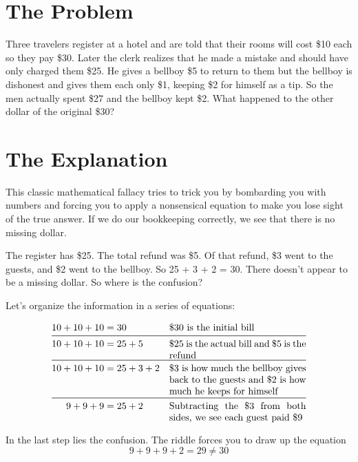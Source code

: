 

\section*{The Problem}
Three travelers register at a hotel and are told that their rooms will cost \$10 each so they pay \$30. Later the clerk realizes that he made a mistake and should have only charged them \$25. He gives a bellboy \$5 to return to them but the bellboy is dishonest and gives them each only \$1, keeping \$2 for himself as a tip. So the men actually spent \$27 and the bellboy kept \$2. What happened to the other dollar of the original \$30?

\section*{The Explanation}
This classic mathematical fallacy tries to trick you by bombarding you with numbers and forcing you to apply a nonsensical equation to make you lose sight of the true answer. If we do our bookkeeping correctly, we see that there is no missing dollar. 

The register has \$25. The total refund was \$5. Of that refund, \$3 went to the guests, and \$2 went to the bellboy. So 25 + 3 + 2 = 30. There doesn’t appear to be a missing dollar. So where is the confusion?

Let’s organize the information in a series of equations:

\vspace{-5mm}

\begin{align*}
    10 + 10 + 10 &= 30 && \text{\$30 is the initial bill} \\
    \midrule
    10 + 10 + 10 &= 25 + 5 && \parbox[t]{5cm}{
          \$25 is the actual bill and \$5 is the refund} \\
    \midrule
    10 + 10 + 10 &= 25 + 3 + 2 && \parbox[t]{5cm}{
          \$3 is how much the bellboy gives back to the guests and \$2 is how much he keeps for himself} \\
    \midrule
    9 + 9 + 9 &= 25 + 2 && \parbox[t]{5cm}{
            Subtracting the \$3 from both sides, we see each guest paid \$9}
\end{align*}

In the last step lies the confusion. The riddle forces you to draw up the equation
\begin{equation*}
    9 + 9 + 9 + 2 = 29 \neq 30
\end{equation*}

